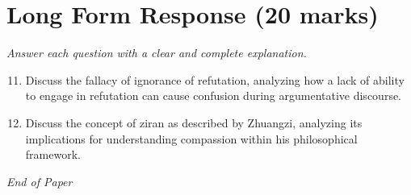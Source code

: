 \documentclass[12pt]{article}
\begin{document}
\section*{Long Form Response (20 marks)}
\textit{Answer each question with a clear and complete explanation.}
\begin{enumerate}[label=\arabic*.]
\setcounter{enumi}{10}
\item Discuss the fallacy of ignorance of refutation, analyzing how a lack of ability to engage in refutation can cause confusion during argumentative discourse.
\item Discuss the concept of ziran as described by Zhuangzi, analyzing its implications for understanding compassion within his philosophical framework.
\end{enumerate}

\vfill
\noindent\textit{End of Paper}
\end{document}
